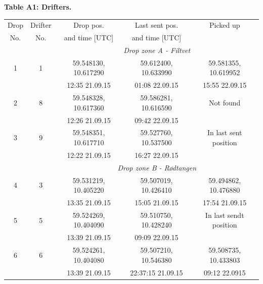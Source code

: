 \documentclass[12pt,a4paper,english]{article}
\begin{document}
\begin{table}[tb]
{\bf Table A1: Drifters.}\\
\label{tab:Drifters}
\begin{tabular}{|c|cccc|} 
        \hline
        Drop & Drifter & Drop pos.            & Last sent pos.          & Picked up                  \\
        No.  & No.     & and time [UTC]       & and time [UTC]          &                            \\ \hline
             &         &          \multicolumn{3}{c}{\textit{Drop zone A - Filtvet}}                 \\ 
        1    & 1       & 59.548130, 10.617290 & 59.612400, 10.633990    & 59.581355, 10.619952       \\
             &         & 12:35 21.09.15       & 01:08 22.09.15          & 15:55 22.09.15             \\ 
        2    & 8       & 59.548328, 10.617360 & 59.586281, 10.616590    & Not found                  \\
             &         & 12:26 21.09.15       & 09:42 22.09.15          &                            \\
        3    & 9       & 59.548351, 10.617710 & 59.527760, 10.537500    & In last sent position      \\
             &         & 12:22 21.09.15       & 16:27 22.09.15          &                            \\ \hline 
             &         &          \multicolumn{3}{c}{\textit{Drop zone B - R\o dtangen}}             \\
        4    & 3       & 59.531219, 10.405220 & 59.507019, 10.426410    & 59.494862, 10.476880       \\
             &         & 13:35 21.09.15       & 15:05 21.09.15          & 17:54 21.09.15             \\
        5    & 5       & 59.524269, 10.404090 & 59.510750, 10.428240    & In last sendt position     \\
             &         & 13:39 21.09.15       & 09:09 22.09.15          &                            \\
        6    & 6       & 59.524261, 10.404080 & 59.507210, 10.546380    & 59.508735, 10.433803       \\
             &         & 13:39 21.09.15       & 22:37:15 21.09.15       & 09:12 22.0915              \\

\end{tabular}
\end{table}
\end{document}
